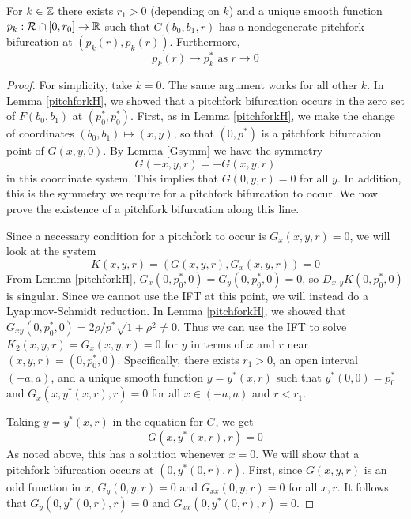 \documentclass[thesis.tex]{subfiles}
\begin{document}
\begin{lemma}\label{pitchpersist}
For $k \in {\mathbb Z}$ there exists $r_1 > 0$ (depending on $k$) and a unique smooth function $p_k: \mathcal{R} \cap [0, r_0] \rightarrow {\mathbb R}$ such that $G(b_0, b_1, r)$ has a nondegenerate pitchfork bifurcation at $(p_k(r),p_k(r))$. Furthermore, 
\begin{equation*}
p_k(r) \rightarrow p_k^* \text{ as } r \rightarrow 0
\end{equation*}
\begin{proof}
For simplicity, take $k = 0$. The same argument works for all other $k$. In Lemma \ref{pitchforkH}, we showed that a pitchfork bifurcation occurs in the zero set of $F(b_0, b_1)$ at $(p_0^*, p_0^*)$. First, as in Lemma \ref{pitchforkH}, we make the change of coordinates $(b_0, b_1) \mapsto (x, y)$, so that $(0, p^*)$ is a pitchfork bifurcation point of $G(x, y, 0)$. By Lemma \ref{Gsymm} we have the symmetry 
\[
G(-x, y, r) = -G(x, y, r)
\]
in this coordinate system. This implies that $G(0, y, r) = 0$ for all $y$. In addition, this is the symmetry we require for a pitchfork bifurcation to occur. We now prove the existence of a pitchfork bifurcation along this line. 

Since a necessary condition for a pitchfork to occur is $G_x(x, y, r) = 0$, we will look at the system
\begin{equation}
K(x,y,r) = (G(x,y,r), G_x(x,y,r)) = 0
\end{equation}
From Lemma \ref{pitchforkH}, $G_x(0,p_0^*,0) = G_y(0, p_0^*, 0) = 0$, so $D_{x,y}K(0,p_0^*,0)$ is singular. Since we cannot use the IFT at this point, we will instead do a Lyapunov-Schmidt reduction. In Lemma \ref{pitchforkH}, we showed that $G_{xy}(0, p_0^*, 0) = 2 \rho/p^* \sqrt{1 + \rho^2} \neq 0$. Thus we can use the IFT to solve $K_2(x,y,r) = G_x(x,y,r) = 0$ for $y$ in terms of $x$ and $r$ near $(x,y,r) = (0, p_0^*, 0)$. Specifically, there exists $r_1 > 0$, an open interval $(-a, a)$, and a unique smooth function $y = y^*(x, r)$ such that $y^*(0, 0) = p_0^*$ and $G_x(x, y^*(x, r), r) = 0$ for all $x \in (-a, a)$ and $r < r_1$.

Taking $y = y^*(x, r)$ in the equation for $G$, we get
\begin{equation}
G(x, y^*(x, r), r) = 0
\end{equation}
As noted above, this has a solution whenever $x = 0$. We will show that a pitchfork bifurcation occurs at $(0, y^*(0, r), r)$. First, since $G(x, y, r)$ is an odd function in $x$, $G_y(0, y, r) = 0$ and $G_{xx}(0, y, r) = 0$ for all $x, r$. It follows that $G_y(0, y^*(0, r), r) = 0$ and $G_{xx}(0, y^*(0, r), r) = 0$.


\end{proof}
\end{lemma}
\end{document}
